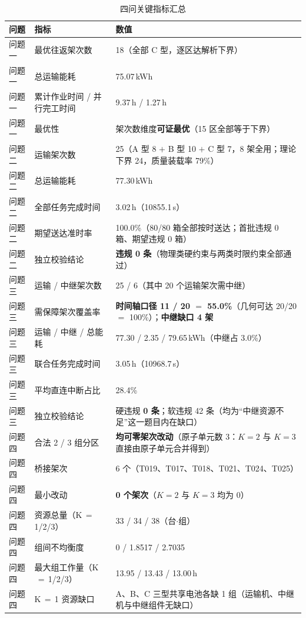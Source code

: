 \begin{table}[htbp]
	\caption{四问关键指标汇总}
	\centering
	\begin{tabular}{lll}
		\toprule
		问题 & 指标 & 数值 \\
		\midrule
		问题一 & 最优往返架次数 & 18（全部 C 型，逐区达解析下界） \\
		问题一 & 总运输能耗 & 75.07\,kWh \\
		问题一 & 累计作业时间 / 并行完工时间 & 9.37\,h / 1.27\,h \\
		问题一 & 最优性 & 架次数维度\textbf{可证最优}（15 区全部等于下界） \\
		\midrule
		问题二 & 运输架次数 & 25（A 型 8 $+$ B 型 10 $+$ C 型 7，8 架全用；理论下界 24，质量装载率 79\%） \\
		问题二 & 总运输能耗 & 77.30\,kWh \\
		问题二 & 全部任务完成时间 & 3.02\,h（10855.1\,s） \\
		问题二 & 期望送达准时率 & 100.0\%（80/80 箱全部按时送达；首批违规 0 箱、期望违规 0 箱） \\
		问题二 & 独立校验结论 & \textbf{违规 0 条}（物理类硬约束与两类时限约束全部通过） \\
		\midrule
		问题三 & 运输 / 中继架次数 & 25 / 6（其中 20 个运输架次需中继） \\
		问题三 & 需保障架次覆盖率 & \textbf{时间轴口径 11 / 20 $=$ 55.0\%}（几何可达 20/20 $=$ 100\%）；\textbf{中继缺口 4 架} \\
		问题三 & 运输 / 中继 / 总能耗 & 77.30 / 2.35 / 79.65\,kWh（中继占 3.0\%） \\
		问题三 & 联合任务完成时间 & 3.05\,h（10968.7\,s） \\
		问题三 & 平均直连中断占比 & 28.4\% \\
		问题三 & 独立校验结论 & 硬违规 \textbf{0 条}；软违规 42 条（均为“中继资源不足”这一题目内在缺口） \\
		\midrule
		问题四 & 合法 2 / 3 组分区 & \textbf{均可零架次改动}（原子单元数 3：$K=2$ 与 $K=3$ 直接由原子单元合并得到） \\
		问题四 & 桥接架次 & 6 个（T019、T017、T018、T021、T024、T025） \\
		问题四 & 最小改动 & \textbf{0 个架次}（$K=2$ 与 $K=3$ 均为 0） \\
		问题四 & 资源总量（K$\,=\,$1/2/3） & 33 / 34 / 38（台$\cdot$组） \\
		问题四 & 组间不均衡度 & 0 / 1.8517 / 2.7035 \\
		问题四 & 最大组工作量（K$\,=\,$1/2/3） & 13.95 / 13.43 / 13.00\,h \\
		问题四 & K$\,=\,$1 资源缺口 & A、B、C 三型共享电池各缺 1 组（运输机、中继机与中继组件无缺口） \\
		\bottomrule
	\end{tabular}
\end{table}

